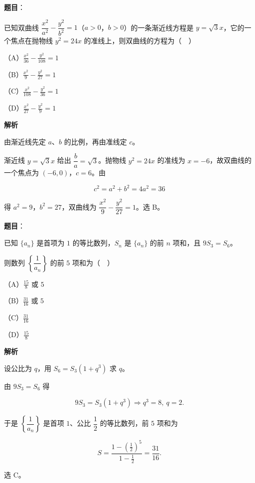 \begin{answer}

\textbf{题目}：

已知双曲线 $\dfrac{x^2}{a^2}-\dfrac{y^2}{b^2}=1$（$a>0$，$b>0$）的一条渐近线方程是 $y=\sqrt3x$，它的一个焦点在抛物线 $y^2=24x$ 的准线上，则双曲线的方程为（　）

（A）$\frac{x^2}{36}-\frac{y^2}{108}=1$

（B）$\frac{x^2}9-\frac{y^2}{27}=1$

（C）$\frac{x^2}{108}-\frac{y^2}{36}=1$

（D）$\frac{x^2}{27}-\frac{y^2}9=1$

\textbf{解析}

由渐近线先定 $a$、$b$ 的比例，再由准线定 $c$。

渐近线 $y=\sqrt3x$ 给出 $\dfrac ba=\sqrt3$。抛物线 $y^2=24x$ 的准线为 $x=-6$，故双曲线的一个焦点为 $(-6,0)$，$c=6$。由

\nopagebreak[4]
\[c^2=a^2+b^2=4a^2=36\]

得 $a^2=9$，$b^2=27$，双曲线为 $\dfrac{x^2}9-\dfrac{y^2}{27}=1$。选 B。


\end{answer}
\begin{answer}

\textbf{题目}：

已知 $\{a_n\}$ 是首项为 $1$ 的等比数列，$S_n$ 是 $\{a_n\}$ 的前 $n$ 项和，且 $9S_3=S_6$。

则数列 $\left\{\dfrac1{a_n}\right\}$ 的前 $5$ 项和为（　）

（A）$\frac{15}8$ 或 $5$

（B）$\frac{31}{16}$ 或 $5$

（C）$\frac{31}{16}$

（D）$\frac{15}8$

\textbf{解析}

设公比为 $q$，用 $S_6=S_3(1+q^3)$ 求 $q$。

由 $9S_3=S_6$ 得

\nopagebreak[4]
\[9S_3=S_3(1+q^3)\Longrightarrow q^3=8,\ q=2.\]

于是 $\left\{\dfrac1{a_n}\right\}$ 是首项 $1$、公比 $\dfrac12$ 的等比数列，前 $5$ 项和为

\nopagebreak[4]
\[S=\frac{1-\left(\frac12\right)^5}{1-\frac12}=\frac{31}{16}.\]

选 C。


\end{answer}
